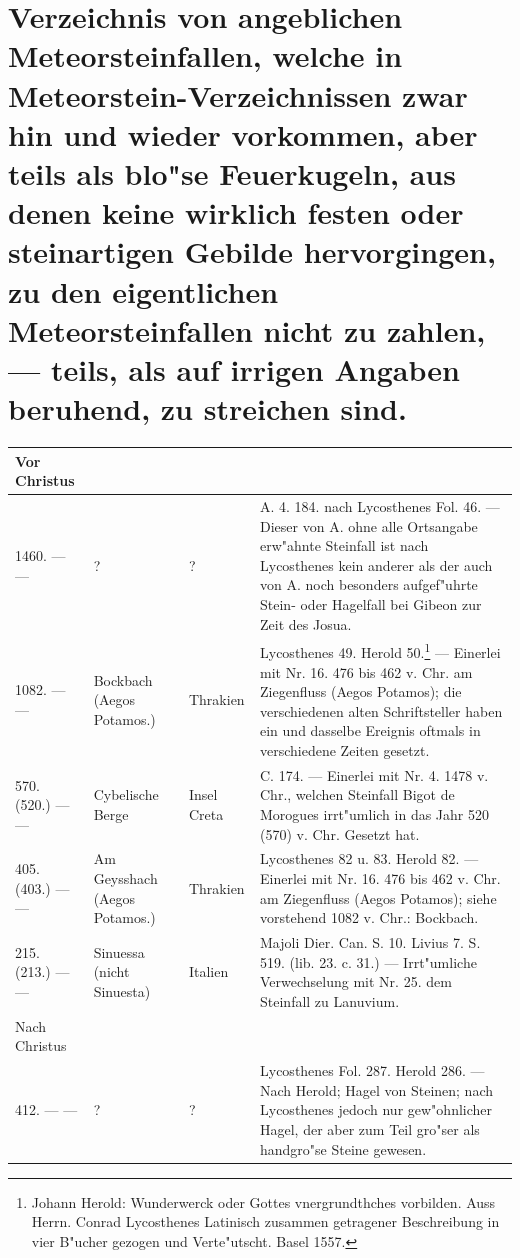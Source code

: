 \documentclass[a4paper, 8pt, oneside, polutonikogreek, german]{article}
\begin{document}
\section{Verzeichnis von angeblichen Meteorsteinfallen, welche in Meteorstein-Verzeichnissen zwar hin und wieder vorkommen, aber teils als blo"se Feuerkugeln, aus denen keine wirklich festen oder steinartigen Gebilde hervorgingen, zu den eigentlichen Meteorsteinfallen nicht zu zahlen, --- teils, als auf irrigen Angaben beruhend, zu streichen sind.}
\begin{center}
    \footnotesize
    \begin{longtable}{| p{20mm} | p{25mm} | p{20mm} | p{55mm} |}
    \hline
        Vor Christus &   &   &   \\ \hline
        1460. --- --- & ? & ? & A. 4. 184. nach Lycosthenes Fol. 46. --- Dieser von A. ohne alle Ortsangabe erw"ahnte Steinfall ist nach Lycosthenes kein anderer als der auch von A. noch besonders aufgef"uhrte Stein- oder Hagelfall bei Gibeon zur Zeit des Josua. \\ \hline
        1082. --- --- & Bockbach (Aegos Potamos.) & Thrakien & Lycosthenes 49. Herold 50.\footnote{Johann Herold: Wunderwerck oder Gottes vnergrundthches vorbilden. Auss Herrn. Conrad Lycosthenes Latinisch zusammen getragener Beschreibung in vier B"ucher gezogen und Verte"utscht. Basel 1557.} --- Einerlei mit Nr. 16. 476 bis 462 v. Chr. am Ziegenfluss (Aegos Potamos); die verschiedenen alten Schriftsteller haben ein und dasselbe Ereignis oftmals in verschiedene Zeiten gesetzt. \\ \hline
        570. (520.) --- --- & Cybelische Berge & Insel Creta & C. 174. --- Einerlei mit Nr. 4. 1478 v. Chr., welchen Steinfall Bigot de Morogues irrt"umlich in das Jahr 520 (570) v. Chr. Gesetzt hat. \\ \hline
        405. (403.) --- --- & Am Geysshach (Aegos Potamos.) & Thrakien & Lycosthenes 82 u. 83. Herold 82. --- Einerlei mit Nr. 16. 476 bis 462 v. Chr. am Ziegenfluss (Aegos Potamos); siehe vorstehend 1082 v. Chr.: Bockbach. \\ \hline
        215. (213.) --- --- & Sinuessa (nicht Sinuesta) & Italien & Majoli Dier. Can. S. 10. Livius 7. S. 519. (lib. 23. c. 31.) --- Irrt"umliche Verwechselung mit Nr. 25. dem Steinfall zu Lanuvium. \\ \hline
        Nach Christus &   &   &   \\ \hline
        412. --- --- & ? & ? & Lycosthenes Fol. 287. Herold 286. --- Nach Herold; Hagel von Steinen; nach Lycosthenes jedoch nur gew"ohnlicher Hagel, der aber zum Teil gro"ser als handgro"se Steine gewesen. \\ \hline

\end{longtable}
\end{center}
\end{document}
